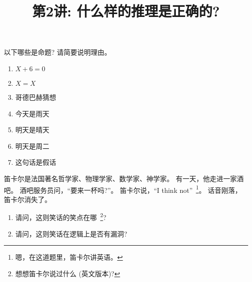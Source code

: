 \documentclass[a4paper, justified]{tufte-handout}
\title{第2讲: 什么样的推理是正确的?}
\date{\zhtoday} %
\begin{document}
\maketitle
\noplagiarism %
\begin{abstract}
  \begin{center}{}
  \end{center}
\end{abstract}
\beginrequired

\begin{problem}
  以下哪些是命题? 请简要说明理由。

  \begin{enumerate}[(1)]
    \item $X + 6 = 0$
    \item $X = X$
    \item 哥德巴赫猜想
    \item 今天是雨天
    \item 明天是晴天
    \item 明天是周二
    \item 这句话是假话
  \end{enumerate}
\end{problem}

\begin{solution}
\end{solution}

\begin{problem}[关于笛卡尔的一则笑话]
  笛卡尔是法国著名哲学家、物理学家、数学家、神学家。
  有一天，他走进一家酒吧。
  酒吧服务员问，``要来一杯吗?''。
  笛卡尔说，``I think not''~\footnote{嗯，在这道题里，笛卡尔讲英语。}。
  话音刚落，笛卡尔消失了。

  \begin{enumerate}[(1)]
    \item 请问，这则笑话的笑点在哪~\footnote{想想笛卡尔说过什么 (英文版本)?}?
    \item 请问，这则笑话在逻辑上是否有漏洞?
  \end{enumerate}
\end{problem}
\end{document}
